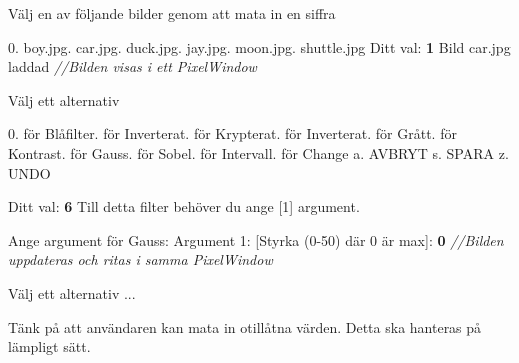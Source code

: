 {\setlength{\parindent}{0cm}

 Välj en av följande bilder genom att mata in en siffra\newline

0. boy.jpg. car.jpg. duck.jpg. jay.jpg. moon.jpg. shuttle.jpg\newline
Ditt val: \textbf{1}\newline
Bild car.jpg laddad\newline
\textit{//Bilden visas i ett PixelWindow}\newline

Välj ett alternativ\newline

0. för Blåfilter. för Inverterat. för Krypterat. för Inverterat. för Grått. för Kontrast. för Gauss. för Sobel. för Intervall. för Change\newline
a. AVBRYT\newline
s. SPARA\newline
z. UNDO\newline

Ditt val: \textbf{6}\newline
Till detta filter behöver du ange [1] argument.\newline

Ange argument för Gauss: \newline
Argument 1: [Styrka (0-50) där 0 är max]: \textbf{0}\newline
\textit{//Bilden uppdateras och ritas i samma PixelWindow}\newline

Välj ett alternativ\newline
...
}

Tänk på att användaren kan mata in otillåtna värden. Detta ska hanteras på lämpligt sätt.

\Task 

